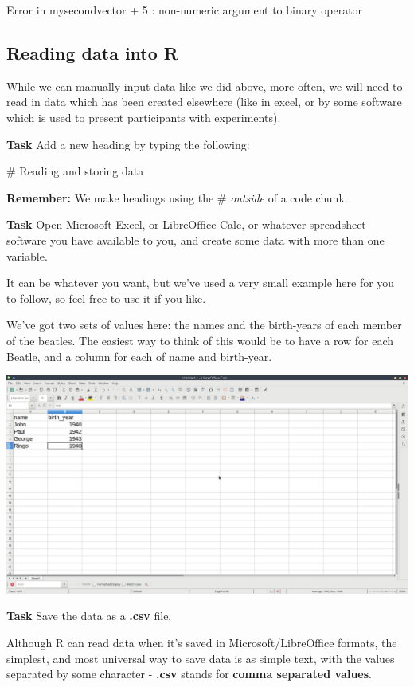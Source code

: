 \documentclass[]{book}
\begin{document}
Error in mysecondvector + 5 : non-numeric argument to binary operator

\hypertarget{reading-data-into-r}{%
\subsection*{Reading data into R}\label{reading-data-into-r}}

While we can manually input data like we did above, more often, we will need to read in data which has been created elsewhere (like in excel, or by some software which is used to present participants with experiments).

\textbf{Task}
Add a new heading by typing the following:

\# Reading and storing data

\textbf{Remember:} We make headings using the \# \emph{outside} of a code chunk.

\textbf{Task}
Open Microsoft Excel, or LibreOffice Calc, or whatever spreadsheet software you have available to you, and create some data with more than one variable.

It can be whatever you want, but we've used a very small example here for you to follow, so feel free to use it if you like.

We've got two sets of values here: the names and the birth-years of each member of the beatles. The easiest way to think of this would be to have a row for each Beatle, and a column for each of name and birth-year.

\includegraphics{images/installing_intro/create_data.png}

\textbf{Task}
Save the data as a \textbf{.csv} file.

Although R can read data when it's saved in Microsoft/LibreOffice formats, the simplest, and most universal way to save data is as simple text, with the values separated by some character - \textbf{.csv} stands for \textbf{comma separated values}.
\end{document}
